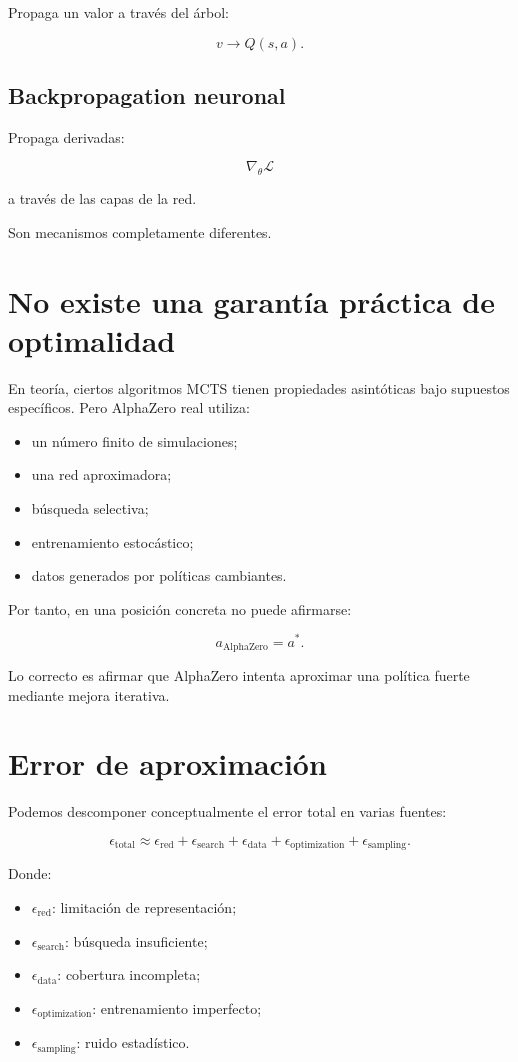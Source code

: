 \documentclass[11pt,a4paper]{article}
\begin{document}
Propaga un valor a través del árbol:

\[
v
\rightarrow
Q(s,a).
\]

\subsection{Backpropagation neuronal}

Propaga derivadas:

\[
\nabla_\theta \mathcal{L}
\]

a través de las capas de la red.

Son mecanismos completamente diferentes.

\section{No existe una garantía práctica de optimalidad}

En teoría, ciertos algoritmos MCTS tienen propiedades asintóticas bajo supuestos específicos. Pero AlphaZero real utiliza:

\begin{itemize}
    \item un número finito de simulaciones;
    \item una red aproximadora;
    \item búsqueda selectiva;
    \item entrenamiento estocástico;
    \item datos generados por políticas cambiantes.
\end{itemize}

Por tanto, en una posición concreta no puede afirmarse:

\[
a_{\mathrm{AlphaZero}}
=
a^*.
\]

Lo correcto es afirmar que AlphaZero intenta aproximar una política fuerte mediante mejora iterativa.

\section{Error de aproximación}

Podemos descomponer conceptualmente el error total en varias fuentes:

\[
\epsilon_{\mathrm{total}}
\approx
\epsilon_{\mathrm{red}}
+
\epsilon_{\mathrm{search}}
+
\epsilon_{\mathrm{data}}
+
\epsilon_{\mathrm{optimization}}
+
\epsilon_{\mathrm{sampling}}.
\]

Donde:

\begin{itemize}
    \item \(\epsilon_{\mathrm{red}}\): limitación de representación;
    \item \(\epsilon_{\mathrm{search}}\): búsqueda insuficiente;
    \item \(\epsilon_{\mathrm{data}}\): cobertura incompleta;
    \item \(\epsilon_{\mathrm{optimization}}\): entrenamiento imperfecto;
    \item \(\epsilon_{\mathrm{sampling}}\): ruido estadístico.
\end{itemize}
\end{document}
